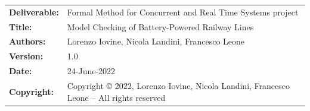 
\begin{table}[h!]
    \begin{tabu} to \textwidth { X[0.3,r,p] X[0.7,l,p] }
    \hline

    \textbf{Deliverable:} & Formal Method for Concurrent and Real Time Systems project\\
    \textbf{Title:} & Model Checking of Battery-Powered Railway Lines \\
    \textbf{Authors:} & Lorenzo Iovine, Nicola Landini, Francesco Leone\\
    \textbf{Version:} & 1.0 \\
    \textbf{Date:} & 24-June-2022 \\
    \textbf{Copyright:} & Copyright © 2022, Lorenzo Iovine, Nicola Landini, Francesco Leone – All rights reserved \\
    \hline
    \end{tabu}
\end{table}




\setcounter{page}{2}


\newpage
{}
\tableofcontents
\newpage
{}
\listoffigures

\clearpage
{}
\label{sect:design}


\clearpage
{}
\label{sect:uppaal}


\clearpage
{}
\label{sect:result}


